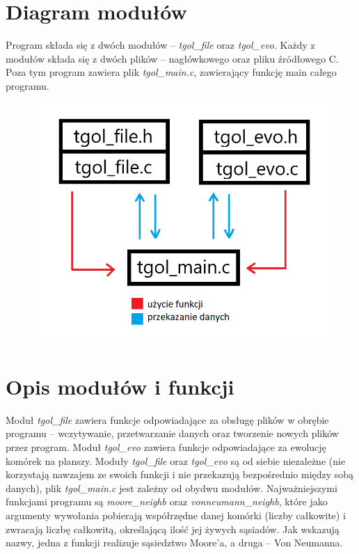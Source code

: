 \documentclass[11pt,a4paper]{report}
\begin{document}
\section{Diagram modułów}\label{sec:teskt}
Program składa się z dwóch modułów --\textsl { tgol\_file} oraz \textsl {tgol\_evo}.
Każdy z modułów składa się z dwóch plików -- nagłówkowego oraz pliku źródłowego C.
Poza tym program zawiera plik \textsl {tgol\_main.c}, zawierający funkcję main całego programu.
\begin{figure}[htbp]
\centerline{\includegraphics{diagram_modułów.png}}
\label{fig}

\end{figure}
\newpage

\section{Opis modułów i funkcji}\label{sec:teskt}
Moduł \textsl {tgol\_file} zawiera funkcje odpowiadające za obsługę plików w obrębie programu -- wczytywanie, przetwarzanie danych oraz tworzenie nowych plików przez program.
Moduł \textsl {tgol\_evo} zawiera funkcje odpowiadające za ewolucję komórek na planszy.
Moduły \textsl {tgol\_file} oraz \textsl {tgol\_evo} są od siebie niezależne (nie korzystają nawzajem ze swoich funkcji i nie przekazują bezpośrednio między sobą danych), plik \textsl {tgol\_main.c} jest zależny od obydwu modułów.
Najważniejszymi funkcjami programu są \textsl{moore\_neighb} oraz \textsl{vonneumann\_neighb}, które jako argumenty wywołania pobierają współrzędne danej komórki (liczby całkowite) i zwracają liczbę całkowitą, określającą ilość jej żywych sąsiadów. Jak wskazują nazwy, jedna z funkcji realizuje sąsiedztwo Moore'a, a druga -- Von Neumanna.
\end{document}
